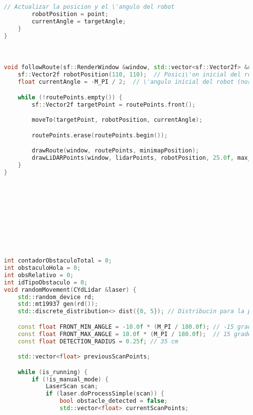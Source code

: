 \begin{lstlisting}[language={C++}, caption={Primer ajuste de c\'odigo}, label={Script}]
        // Actualizar la posicion y el \'angulo del robot
        robotPosition = point;
        currentAngle = targetAngle;
    }
}



void followRoute(sf::RenderWindow &window, std::vector<sf::Vector2f> &routePoints, const LaserScan &lidarPoints, const sf::Vector2f &minimapPosition, float max_range) {
    sf::Vector2f robotPosition(110, 110);  // Posici\'on inicial del robot en el minimapa
    float currentAngle = -M_PI / 2;  // \'angulo inicial del robot (norte en -90°)

    while (!routePoints.empty()) {
        sf::Vector2f targetPoint = routePoints.front();

        moveTo(targetPoint, robotPosition, currentAngle);

        routePoints.erase(routePoints.begin());

        drawRoute(window, routePoints, minimapPosition);
        drawLiDARPoints(window, lidarPoints, robotPosition, 25.0f, max_range);
    }
}










int contadorObstaculoTotal = 0;
int obstaculoHola = 0;
int obsRelativo = 0;
int idTipoObstaculo = 0;
void randomMovement(CYdLidar &laser) {
    std::random_device rd;
    std::mt19937 gen(rd());
    std::discrete_distribution<> dist({0, 5}); // Distribucin para la probabilidad de movimiento

    const float FRONT_MIN_ANGLE = -10.0f * (M_PI / 180.0f); // -15 grados en radaianes
    const float FRONT_MAX_ANGLE = 10.0f * (M_PI / 180.0f);  // 15 grados en radianes
    const float DETECTION_RADIUS = 0.25f; // 35 cm

    std::vector<float> previousScanPoints;

    while (is_running) {
        if (!is_manual_mode) {
            LaserScan scan;
            if (laser.doProcessSimple(scan)) {
                bool obstacle_detected = false;
                std::vector<float> currentScanPoints;
                

\end{lstlisting}

